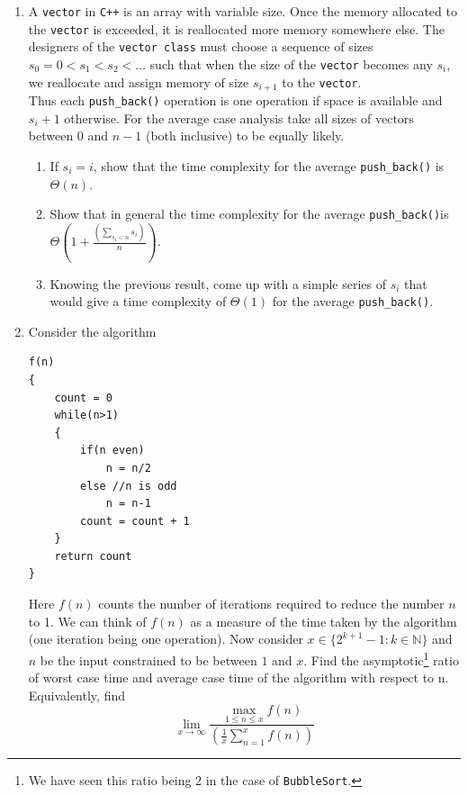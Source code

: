 \begin{enumerate}

\item[\textbf{1}]
A \texttt{vector} in \texttt{C++} is an array with variable size. Once the memory 
allocated to the \texttt{vector} is exceeded, it is reallocated more memory somewhere else. 
The designers of the \texttt{vector class} must choose a sequence of sizes \(s_0=0 < s_1 < s_2 < \ldots\) 
such that when the size of the \texttt{vector} becomes any $s_i$, we reallocate and assign memory of size 
\(s_{i+1}\) to the \texttt{vector}.\\


\noindent Thus each \texttt{push\_back()} operation is one operation if space is available and \(s_i+1\) otherwise. 
For the average case analysis take all sizes of vectors between $0$ and $n-1$ (both inclusive) to be equally likely.

\begin{enumerate}[label=\textbf{(\alph*)}]
\item If $s_i=i$, show that the time complexity for the average \texttt{push\_back()} is $\Theta(n)$.
\item Show that in general the time complexity for the average \texttt{push\_back()}is $\Theta \left( 1+\frac{\left(\sum\limits_{s_i<n}s_i\right)}{n} \right)$. 
\item Knowing the previous result, come up with a simple series of \(s_i\) that would 
give a time complexity of $\Theta(1)$ for the average \texttt{push\_back()}.
\end{enumerate}


\item[\textbf{2}]
Consider the algorithm

\begin{center}
\begin{minipage}{0.9\linewidth}
\begin{framed}
\begin{Verbatim}
f(n) 
{
    count = 0
    while(n>1)
    {
        if(n even)
            n = n/2
        else //n is odd
            n = n-1
        count = count + 1
    }
    return count
}
\end{Verbatim}
\vspace{-4mm}
\end{framed}
\end{minipage}
\end{center}

Here \(f(n)\) counts the number of iterations required to reduce the number \(n\) to 1. We can think of $f(n)$ as a measure 
of the time taken by the algorithm (one iteration being one operation). Now consider $x \in \{2^{k+1}-1 : k \in \mathbb{N}\}$ and $n$ be the input constrained to be between $1$ and $x$.
Find the asymptotic\footnote{We have seen this ratio being 2 in the case of \texttt{BubbleSort}.} ratio of worst case time and average case time of the algorithm with respect to n. Equivalently, find  
\[
\lim_{x \to \infty}
\frac{\max_{1 \le n \le x} f(n)}
{\left( \frac{1}{x} \sum_{n=1}^{x} f(n) \right)}
\]

\end{enumerate}